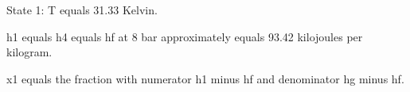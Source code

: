 State 1: T equals 31.33 Kelvin.

h1 equals h4 equals hf at 8 bar approximately equals 93.42 kilojoules per kilogram.

x1 equals the fraction with numerator h1 minus hf and denominator hg minus hf.